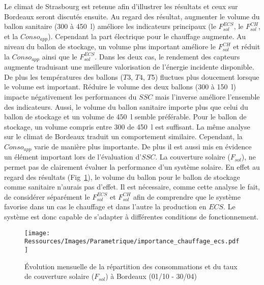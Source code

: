 Le climat de Strasbourg est retenue afin d’illustrer les résultats et ceux sur Bordeaux
seront discutés ensuite. Au regard des résultat, augmenter le volume du ballon sanitaire
(\num{300} à \SI{450}{\litre}) améliore les indicateurs principaux (le $F_{sol}^{ECS}$, le
$F_{sol}^{CH}$, et la $Conso_{app}$). Cependant la part électrique pour le chauffage
augmente. Au niveau du ballon de stockage, un volume plus important améliore le $F_{sol}^{CH}$
et réduit la $Conso_{app}$ ainsi que le $F_{sol}^{ECS}$. Dans les deux cas, le rendement des
capteurs augmente traduisant une meilleure valorisation de l’énergie incidente disponible.
De plus les températures des ballons ($T3$, $T4$, $T5$) fluctues plus doucement lorsque le
volume est important. Réduire le volume des deux ballons (\num{300} à \SI{150}{\litre})
impacte négativement les performances du $SSC$ mais l’inverse améliore l’ensemble des
indicateurs. Aussi, le volume du ballon sanitaire importe plus que celui du ballon de
stockage et un volume de \SI{450}{\litre} semble préférable. Pour le ballon de stockage,
un volume compris entre \num{300} de \SI{450}{\litre} est suffisant. La même analyse sur
le climat de Bordeaux traduit un comportement similaire. Cependant, la $Conso_{app}$
varie de manière plus importante. De plus il est aussi mis en
évidence un élément important lors de l’évaluation d’$SSC$. La couverture solaire
($F_{sol}$), ne permet pas de clairement évaluer la performance d’un système solaire. En
effet au regard des résultats (Fig~\ref{fig:importance_chauffage_ecs}), le volume du
ballon pour le ballon de stockage comme sanitaire n’aurais pas d’effet. Il est nécessaire,
comme cette analyse le fait, de considérer séparément le $F_{sol}^{ECS}$ et $F_{sol}^{CH}$ afin de
comprendre que le système favorise dans un cas le chauffage et dans l’autre la production
en $ECS$. Le système est donc capable de s’adapter à différentes conditions de
fonctionnement.

\begin{figure}
    \begin{center}
        \texttt{[image: Ressources/Images/Parametrique/importance\_chauffage\_ecs.pdf]}
    \end{center}
    \caption{Évolution mensuelle de la répartition des consommations et du taux
             de couverture solaire ($F_{sol}$) à Bordeaux (01/10 - 30/04)
             \label{fig:importance_chauffage_ecs}}
\end{figure}

